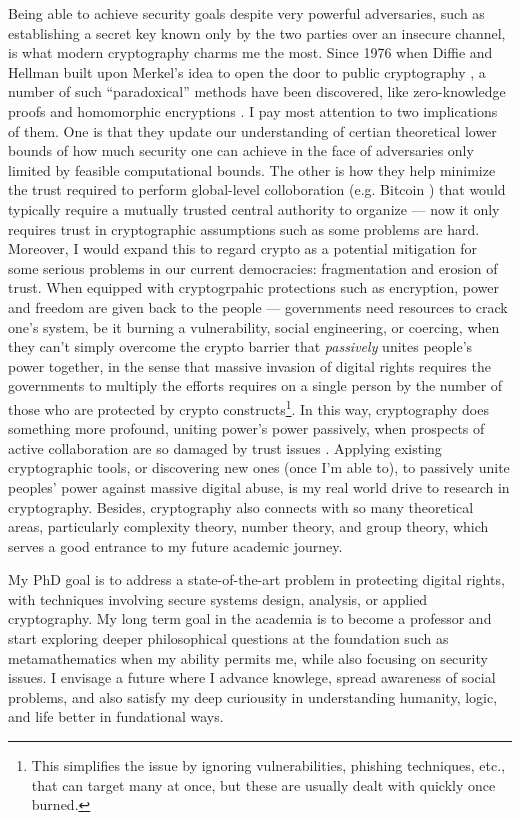 \documentclass[10pt]{article}
\begin{document}
Being able to achieve security goals despite very powerful adversaries, such as
establishing a secret key known only by the two parties over an insecure
channel, is what modern cryptography charms me the most. Since 1976 when Diffie
and Hellman built upon Merkel's idea to open the door to public cryptography
\cite{new.directions.crypto}, a number of such ``paradoxical'' methods have
been discovered, like zero-knowledge proofs \cite{zero.knowledge,
zero.knowledge.np} and homomorphic encryptions \cite{first.full.homo}. I pay
most attention to two implications of them. One is that they update our
understanding of certian theoretical lower bounds of how much security one can
achieve in the face of adversaries only limited by feasible computational
bounds. The other is how they help minimize the trust required to perform
global-level colloboration (e.g. Bitcoin \cite{bitcoin}) that would typically
require a mutually trusted central authority to organize --- now it only
requires trust in cryptographic assumptions such as some problems are hard.
Moreover, I would expand this to regard crypto as a potential mitigation for
some serious problems in our current democracies: fragmentation and erosion of
trust. When equipped with cryptogrpahic protections such as encryption, power
and freedom are given back to the people --- governments need resources to
crack one's system, be it burning a vulnerability, social engineering, or
coercing, when they can't simply overcome the crypto barrier that
\emph{passively} unites people's power together, in the sense that massive
invasion of digital rights requires the governments to multiply the efforts
requires on a single person by the number of those who are protected by crypto
constructs\footnote{This simplifies the issue by ignoring vulnerabilities,
	phishing techniques, etc., that can target many at once, but these are
usually dealt with quickly once burned.}. In this way, cryptography does
something more profound, uniting power's power passively, when prospects of
active collaboration are so damaged by trust issues \cite{trust.book.fukuyama,
how.democracies.die}. Applying existing cryptographic tools, or discovering new
ones (once I'm able to), to passively unite peoples' power against massive
digital abuse, is my real world drive to research in cryptography. Besides,
cryptography also connects with so many theoretical areas, particularly
complexity theory, number theory, and group theory, which serves a good
entrance to my future academic journey.

My PhD goal is to address a state-of-the-art problem in protecting digital
rights, with techniques involving secure systems design, analysis, or applied
cryptography. My long term goal in the academia is to become a professor and
start exploring deeper philosophical questions at the foundation such as
metamathematics when my ability permits me, while also focusing on security
issues. I envisage a future where I advance knowlege, spread awareness of
social problems, and also satisfy my deep curiousity in understanding humanity,
logic, and life better in fundational ways.




\end{document}
